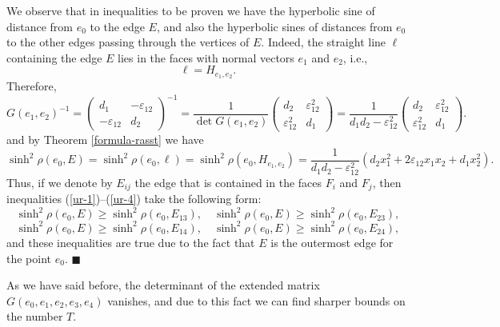 \documentclass[14pt]{article}
\newenvironment{proof}                    
       {\par\indent{\bf Proof. }} 
	        {\hfill $\scriptstyle\blacksquare$}
\begin{document}
\begin{proof}
We observe that in inequalities to be proven we have
the hyperbolic sine of distance from $e_0$ to the edge $E$, and also
the hyperbolic sines of distances from $e_0$ to the other
edges passing through the vertices of $E$. 
Indeed, the straight line $\ell$ containing
the edge $E$ lies in the faces with normal vectors $e_1$
and $e_2$, i.e.,
$$
\ell  = H_{e_1, e_2}.
$$
Therefore,
$$
G(e_1, e_2)^{-1} =
\begin{pmatrix}
d_1 & -\varepsilon_{12}\\
-\varepsilon_{12} & d_2
\end{pmatrix}^{-1} = \dfrac{1}{\det G(e_1, e_2)}
\begin{pmatrix}
d_2 &  \varepsilon_{12}^2\\
\varepsilon_{12}^2 & d_1
\end{pmatrix}= \dfrac{1}{d_1 d_2 - \varepsilon_{12}^2}
\begin{pmatrix}
d_2 &  \varepsilon_{12}^2\\
\varepsilon_{12}^2 & d_1
\end{pmatrix}.
$$
and by Theorem \ref{formula-rasst} we have
$$
\sinh^2 \rho(e_0, E) = \sinh^2 \rho(e_0, \ell)= \sinh^2 \rho(e_0, H_{e_1, e_2}) =
\dfrac{1}{d_1 d_2 - \varepsilon_{12}^2}(d_2 x_1^2
+ 2 \varepsilon_{12} x_1 x_2 + d_1
x_2^2).
$$
Thus, if we denote by $E_{ij}$ the edge that is contained in
 the faces $F_i$ and $F_j$, then
inequalities (\ref{ur-1})--(\ref{ur-4}) take the following form:
$$
\sinh^2 \rho(e_0, E) \ge \sinh^2 \rho(e_0, E_{13}), \quad \sinh^2 \rho(e_0, E)
\ge \sinh^2
\rho(e_0, E_{23}),
$$
$$
\sinh^2 \rho(e_0, E) \ge \sinh^2 \rho(e_0, E_{14}), \quad \sinh^2 \rho(e_0, E) \ge
\sinh^2 \rho(e_0, E_{24}),
$$
and these inequalities are true due to the fact that $E$ is the outermost edge for the point $e_0$.
\end{proof}

As we have said before, the determinant of the extended matrix
 $G(e_0, e_1, e_2, e_3, e_4)$ vanishes, and due to this fact we can find
 sharper bounds on the number $T$.
\end{document}
